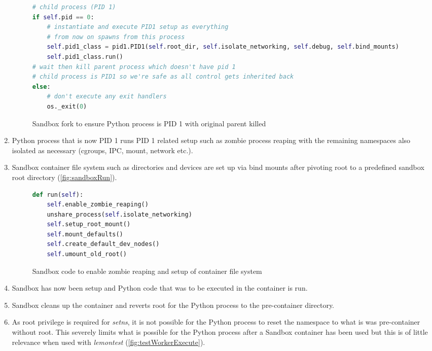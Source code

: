 \documentclass[hidelinks]{report}
\begin{document}
\begin{enumerate}
\begin{figure}[h]
\begin{lstlisting}[language=python, breaklines=true, linewidth=\linewidth, tabsize=4]
# child process (PID 1)
if self.pid == 0:
    # instantiate and execute PID1 setup as everything
    # from now on spawns from this process
    self.pid1_class = pid1.PID1(self.root_dir, self.isolate_networking, self.debug, self.bind_mounts)
    self.pid1_class.run()
# wait then kill parent process which doesn't have pid 1
# child process is PID1 so we're safe as all control gets inherited back
else:
    # don't execute any exit handlers
    os._exit(0)
		\end{lstlisting}
		\caption{Sandbox fork to ensure Python process is PID 1 with original parent killed}
		\label{fig:sandboxFork}
	\end{figure}
	\item Python process that is now PID 1 runs PID 1 related setup such as zombie process reaping with the remaining namespaces also isolated as necessary (cgroups, IPC, mount, network etc.).
	\item Sandbox container file system such as directories and devices are set up via bind mounts after pivoting root to a predefined sandbox root directory (\autoref{fig:sandboxRun}).
	\begin{figure}[h]
		\centering
		\begin{lstlisting}[language=python, breaklines=true, linewidth=\linewidth, tabsize=4]
def run(self):
    self.enable_zombie_reaping()
    unshare_process(self.isolate_networking)
    self.setup_root_mount()
    self.mount_defaults()
    self.create_default_dev_nodes()
    self.umount_old_root()
		\end{lstlisting}
		\caption{Sandbox code to enable zombie reaping and setup of container file system}
		\label{fig:sandboxRun}
	\end{figure}
	\item Sandbox has now been setup and Python code that was to be executed in the container is run.
	\item Sandbox cleans up the container and reverts root for the Python process to the pre-container directory.
	\item As root privilege is required for \textit{setns}, it is not possible for the Python process to reset the namespace to what is was pre-container without root. This severely limits what is possible for the Python process after a Sandbox container has been used but this is of little relevance when used with \textit{lemontest} (\autoref{fig:testWorkerExecute}).
\end{enumerate}
\end{document}
